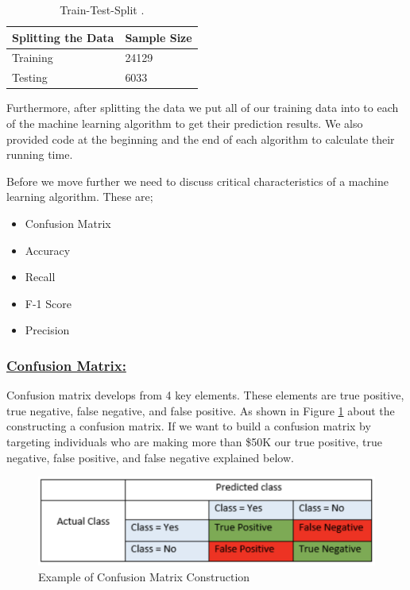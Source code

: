\documentclass[sigconf]{acmart}
\begin{document}
\begin{table}[!ht]
\centering
\begin{tabular}{|l|l|}
\hline
\textbf{Splitting the Data} & \textbf{Sample Size} \\ \hline
Training                    & 24129                \\ \hline
Testing                     & 6033                 \\ \hline
\end{tabular}
\caption{Train-Test-Split \cite{Borga2017}.}
\label{split}
\end{table}

\par Furthermore, after splitting the data we put all of our training data into to each of the machine learning algorithm to get their prediction results. We also provided code at the beginning and the end of each algorithm to calculate their running time.

\par Before we move further we need to discuss critical characteristics of a machine learning algorithm. These are;

\begin{itemize}
    \item Confusion Matrix
    \item Accuracy
    \item Recall
    \item F-1 Score
    \item Precision 
\end{itemize}

\subsubsection{\textbf{\underline{Confusion Matrix:}}}
Confusion matrix develops from 4 key elements. These elements are true positive, true negative, false negative, and false positive. As shown in Figure \ref{fig:confusion-matrix} about the constructing a confusion matrix. If we want to build a confusion matrix by targeting individuals who are making more than \$50K our true positive, true negative, false positive, and false negative explained below. 

\begin{figure}[!ht]
  \centering
      \includegraphics[width=\columnwidth]{images/confusion-matrix.png}
  \caption{Example of Confusion Matrix Construction \cite{www-exsilio}}\label{fig:confusion-matrix}
\end{figure}
\end{document}
